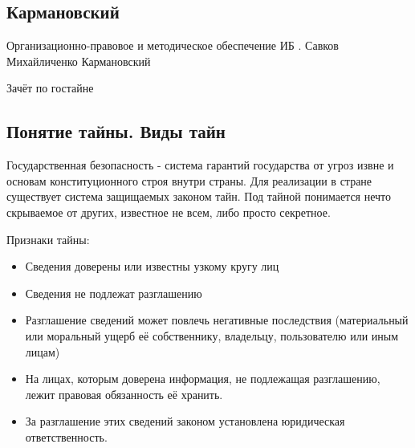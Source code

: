 \documentclass[a4paper,12pt]{report}
\begin{document}
	\def \nocredits {}
	\def \LineE {Конспект по дисциплине}
	\def \LineF {Организационно-правовые основы ИБ}

	\maketitle


\subsection*{Кармановский}
	Организационно-правовое и методическое обеспечение ИБ . Савков Михайличенко Кармановский

	Зачёт по гостайне

\subsection{Понятие тайны. Виды тайн}
	Государственная безопасность - система гарантий государства от угроз извне и основам конституционного строя внутри страны. Для реализации в стране существует система защищаемых законом тайн. Под тайной понимается нечто скрываемое от других, известное не всем, либо просто секретное.

	Признаки тайны:
	\begin{itemize}
	\item	Сведения доверены или известны узкому кругу лиц
	\item	Сведения не подлежат разглашению
	\item	Разглашение сведений может повлечь негативные последствия (материальный или моральный ущерб её собственнику, владельцу, пользователю или иным лицам)
	\item	На лицах, которым доверена информация, не подлежащая разглашению, лежит правовая обязанность её хранить.
	\item	За разглашение этих сведений законом установлена юридическая ответственность.
	\end{itemize}
\end{document}
